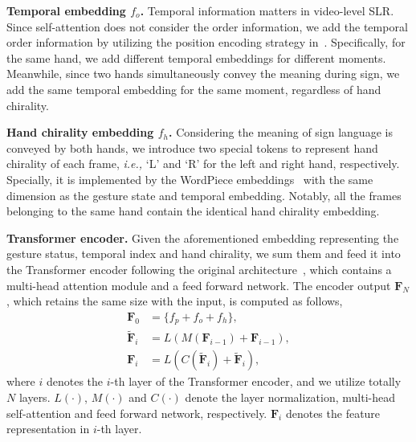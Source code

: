 \documentclass[10pt,twocolumn,letterpaper]{article}
\begin{document}
\noindent \textbf{Temporal embedding $f_o$.}
Temporal information matters in video-level SLR.
Since self-attention does not consider the order information, we add the temporal order information by utilizing the position encoding strategy in~\cite{vaswani2017attention}.
Specifically, for the same hand, we add different temporal embeddings for different moments.
Meanwhile, since two hands simultaneously convey the meaning during sign, we add the same temporal embedding for the same moment, regardless of hand chirality.


\noindent \textbf{Hand chirality embedding $f_h$.}
Considering the meaning of sign language is conveyed by both hands, we introduce two special tokens to represent hand chirality of each frame, \emph{i.e.,} `L' and `R' for the left and right hand, respectively.
Specially, it is implemented by the WordPiece embeddings~\cite{wu2016google} with the same dimension as the gesture state and temporal embedding.
Notably, all the frames belonging to the same hand contain the identical hand chirality embedding.



\noindent \textbf{Transformer encoder.}
Given the aforementioned embedding representing the gesture status, temporal index and hand chirality, we sum them and feed it into the Transformer encoder following the original architecture~\cite{vaswani2017attention}, which contains a multi-head attention module and a feed forward network.
The encoder output $\mathbf{F}_N$, which retains the same size with the input, is computed as follows,
\begin{equation}
\begin{split}
	\mathbf{F}_0 &= \{f_{p}+f_{o}+f_{h}\}, \\
	\widetilde{\mathbf{F}}_i &= L(M(\mathbf{F}_{i-1}) + \mathbf{F}_{i-1}), \\
	\mathbf{F}_i &= L(C(\widetilde{\mathbf{F}}_i) + \widetilde{\mathbf{F}}_i),
\end{split}
\end{equation}
where $i$ denotes the $i$-th layer of the Transformer encoder, and we utilize totally $N$ layers. 
$L(\cdot)$, $M(\cdot)$ and $C(\cdot)$ denote the layer normalization, multi-head self-attention and feed forward network, respectively.
$\mathbf{F}_i$ denotes the feature representation in $i$-th layer.
\end{document}
